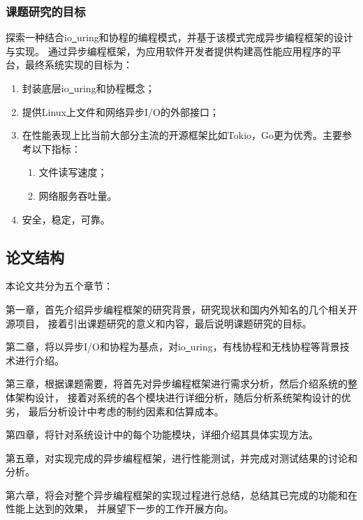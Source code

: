 \documentclass[supercite]{HustGraduPaper}
\theoremstyle{definition}
\begin{document}
\subsubsection{课题研究的目标}
探索一种结合io\underline{~}uring和协程的编程模式，并基于该模式完成异步编程框架的设计与实现。
通过异步编程框架，为应用软件开发者提供构建高性能应用程序的平台，最终系统实现的目标为：

\begin{enumerate}[label={(\arabic*)}]
  \item 封装底层io\underline{~}uring和协程概念；
  \item 提供Linux上文件和网络异步I/O的外部接口；
  \item 在性能表现上比当前大部分主流的开源框架比如Tokio，Go更为优秀。主要参考以下指标：
    \begin{enumerate}
      \item 文件读写速度；
      \item 网络服务吞吐量。
    \end{enumerate}
  \item 安全，稳定，可靠。
\end{enumerate}


\subsection{论文结构}
本论文共分为五个章节：\par

第一章，首先介绍异步编程框架的研究背景，研究现状和国内外知名的几个相关开源项目，
接着引出课题研究的意义和内容，最后说明课题研究的目标。\par

第二章，将以异步I/O和协程为基点，对io\underline{~}uring，有栈协程和无栈协程等背景技术进行介绍。\par

第三章，根据课题需要，将首先对异步编程框架进行需求分析，然后介绍系统的整体架构设计，
接着对系统的各个模块进行详细分析，随后分析系统架构设计的优劣，
最后分析设计中考虑的制约因素和估算成本。\par

第四章，将针对系统设计中的每个功能模块，详细介绍其具体实现方法。\par

第五章，对实现完成的异步编程框架，进行性能测试，并完成对测试结果的讨论和分析。\par

第六章，将会对整个异步编程框架的实现过程进行总结，总结其已完成的功能和在性能上达到的效果，
并展望下一步的工作开展方向。\par
\end{document}
